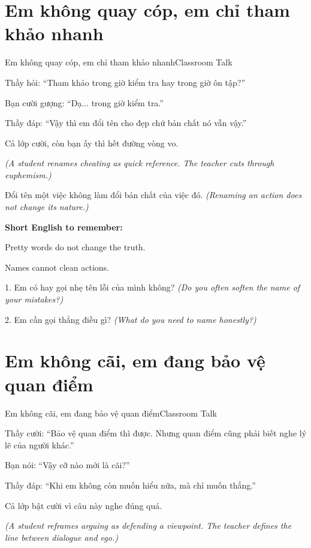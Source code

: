 \section{Em không quay cóp, em chỉ tham khảo nhanh}
\begin{truyen}{Em không quay cóp, em chỉ tham khảo nhanh}{Classroom Talk}

Thầy hỏi: ``Tham khảo trong giờ kiểm tra hay trong giờ ôn tập?''

Bạn cười gượng: ``Dạ... trong giờ kiểm tra.''

Thầy đáp: ``Vậy thì em đổi tên cho đẹp chứ bản chất nó vẫn vậy.''

Cả lớp cười, còn bạn ấy thì hết đường vòng vo.

\textit{(A student renames cheating as quick reference. The teacher cuts through euphemism.)}
\end{truyen}

\begin{baihoc}
Đổi tên một việc không làm đổi bản chất của việc đó.
\textit{(Renaming an action does not change its nature.)}
\end{baihoc}

\begin{ghinhoanh}
\textbf{Short English to remember:}

Pretty words do not change the truth.

Names cannot clean actions.
\end{ghinhoanh}

\begin{tuhocnhanh}
1. Em có hay gọi nhẹ tên lỗi của mình không? \textit{(Do you often soften the name of your mistakes?)}

2. Em cần gọi thẳng điều gì? \textit{(What do you need to name honestly?)}
\end{tuhocnhanh}
\ngancach

\section{Em không cãi, em đang bảo vệ quan điểm}
\begin{truyen}{Em không cãi, em đang bảo vệ quan điểm}{Classroom Talk}

Thầy cười: ``Bảo vệ quan điểm thì được. Nhưng quan điểm cũng phải biết nghe lý lẽ của người khác.''

Bạn nói: ``Vậy cỡ nào mới là cãi?''

Thầy đáp: ``Khi em không còn muốn hiểu nữa, mà chỉ muốn thắng.''

Cả lớp bật cười vì câu này nghe đúng quá.

\textit{(A student reframes arguing as defending a viewpoint. The teacher defines the line between dialogue and ego.)}
\end{truyen}

